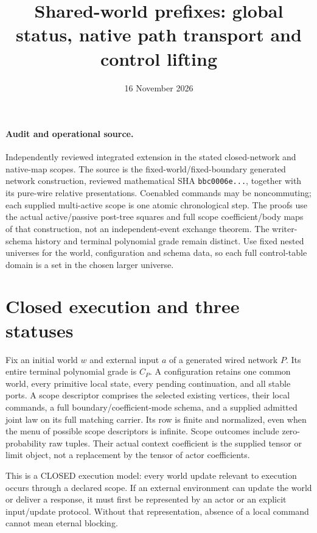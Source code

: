 \documentclass[11pt]{article}
\title{Shared-world prefixes: global status, native path transport and control lifting}
\date{16 November 2026}
\begin{document}
\maketitle
\paragraph{Audit and operational source.} Independently reviewed integrated extension in the stated closed-network and native-map scopes. The source is the fixed-world/fixed-boundary generated network construction, reviewed mathematical SHA \texttt{bbc0006e...}, together with its pure-wire relative presentations. Coenabled commands may be noncommuting; each supplied multi-active scope is one atomic chronological step. The proofs use the actual active/passive post-tree squares and full scope coefficient/body maps of that construction, not an independent-event exchange theorem. The writer-schema history and terminal polynomial grade remain distinct. Use fixed nested universes for the world, configuration and schema data, so each full control-table domain is a set in the chosen larger universe.

\section{Closed execution and three statuses}
Fix an initial world $w$ and external input $a$ of a generated wired network
$P$. Its entire terminal polynomial grade is $C_P$. A configuration retains
one common world, every primitive local state, every pending continuation,
and all stable ports. A scope descriptor comprises the selected existing
vertices, their local commands, a full boundary/coefficient-mode schema,
and a supplied admitted joint law on its full matching carrier. Its row is
finite and normalized, even when the menu of possible scope descriptors is
infinite. Scope outcomes include zero-probability raw tuples. Their actual
context coefficient is the supplied tensor or limit object, not a replacement
by the tensor of actor coefficients.

This is a CLOSED execution model: every world update relevant to execution
occurs through a declared scope. If an external environment can update the
world or deliver a response, it must first be represented by an actor or an
explicit input/update protocol. Without that representation, absence of a
local command cannot mean eternal blocking.
\end{document}
